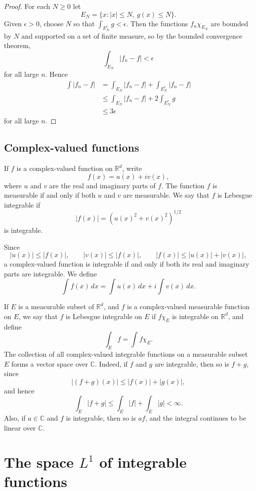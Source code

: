 \documentclass[11pt,openany]{book}
\begin{document}
\begin{proof}
For each $N\geq0$ let
\[
E_N=\{x:|x|\leq N,\ g(x)\leq N\}.
\]
Given $\epsilon>0$, choose $N$ so that $\int_{E_N^c}g<\epsilon$. Then the functions $f_n\chi_{E_N}$ are bounded by $N$ and supported on a set of finite measure, so by the bounded convergence theorem,
\[
\int_{E_N}|f_n-f|<\epsilon
\]
for all large $n$. Hence
\begin{align*}
\int|f_n-f|
&=\int_{E_N}|f_n-f|+\int_{E_N^c}|f_n-f|\\
&\leq\int_{E_N}|f_n-f|+2\int_{E_N^c}g\\
&\leq3\epsilon
\end{align*}
for all large $n$.
\end{proof}

\subsection*{Complex-valued functions}

If $f$ is a complex-valued function on $\mathbb{R}^d$, write
\[
f(x)=u(x)+iv(x),
\]
where $u$ and $v$ are the real and imaginary parts of $f$. The function $f$ is measurable if and only if both $u$ and $v$ are measurable. We say that $f$ is Lebesgue integrable if
\[
|f(x)|=(u(x)^2+v(x)^2)^{1/2}
\]
is integrable.

Since
\[
|u(x)|\leq|f(x)|,
\qquad
|v(x)|\leq|f(x)|,
\qquad
|f(x)|\leq|u(x)|+|v(x)|,
\]
a complex-valued function is integrable if and only if both its real and imaginary parts are integrable. We define
\[
\int f(x)\,dx
=\int u(x)\,dx+i\int v(x)\,dx.
\]

If $E$ is a measurable subset of $\mathbb{R}^d$, and $f$ is a complex-valued measurable function on $E$, we say that $f$ is Lebesgue integrable on $E$ if $f\chi_E$ is integrable on $\mathbb{R}^d$, and define
\[
\int_Ef=\int f\chi_E.
\]
The collection of all complex-valued integrable functions on a measurable subset $E$ forms a vector space over $\mathbb{C}$. Indeed, if $f$ and $g$ are integrable, then so is $f+g$, since
\[
|(f+g)(x)|\leq|f(x)|+|g(x)|,
\]
and hence
\[
\int_E|f+g|\leq\int_E|f|+\int_E|g|<\infty.
\]
Also, if $a\in\mathbb{C}$ and $f$ is integrable, then so is $af$, and the integral continues to be linear over $\mathbb{C}$.

\section{The space $L^1$ of integrable functions}
\end{document}
